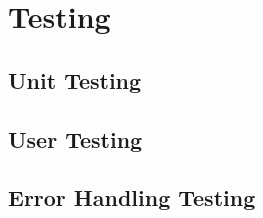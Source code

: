 \documentclass{article}
\begin{document}
\section{Testing}

    \subsection{Unit Testing}

    \subsection{User Testing}

    \subsection{Error Handling Testing}
\end{document}
